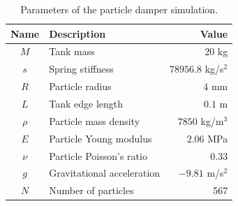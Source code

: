 \documentclass[a4paper,12pt,openany]{book}
\theoremstyle{break}
\begin{document}
\begin{table}[h!]
\begin{center}
\caption{Parameters of the particle damper simulation.}\label{tbl:particle_damper_values}
\begin{tabular}{ c l r } 
\toprule[1.5pt]
\bf Name & \bf Description & \bf Value \\
\midrule
$M$ & Tank mass & $20$ kg \\
$s$ & Spring stiffness & $78956.8$ kg/s$^2$ \\
$R$ & Particle radius & $4$ mm \\
$L$ & Tank edge length & $0.1$ m \\
$\rho$ & Particle mass density & $7850$ kg/m$^3$ \\
$E$ & Particle Young modulus & $2.06$ MPa \\
$\nu$ & Particle Poisson's ratio & $0.33$ \\
$g$ & Gravitational acceleration & $-9.81$ m/s${^2}$ \\
$N$ & Number of particles & 567 \\
\bottomrule[1.25pt]
\end{tabular}
\end{center}
\end{table}
\end{document}
